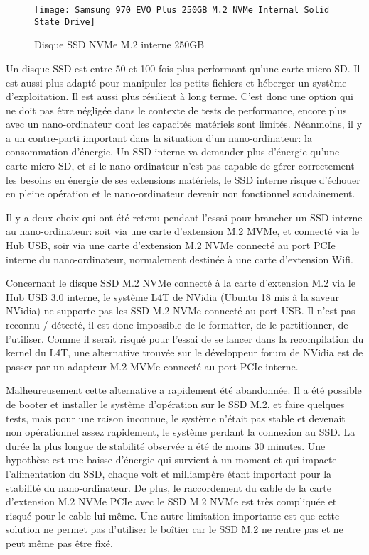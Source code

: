 \begin{figure}[H]
    \centering
    \texttt{[image: Samsung 970 EVO Plus 250GB M.2 NVMe Internal Solid State Drive]}
    \caption{Disque SSD NVMe M.2 interne 250GB}
    \label{fig:disquessd}
\end{figure}
\par Un disque SSD est entre 50 et 100 fois plus performant qu'une carte micro-SD. Il est aussi plus adapté pour manipuler les petits fichiers et héberger un système d'exploitation. Il est aussi plus résilient à long terme. C'est donc une option qui ne doit pas être négligée dans le contexte de tests de performance, encore plus avec un nano-ordinateur dont les capacités matériels sont limités. Néanmoins, il y a un contre-parti important dans la situation d'un nano-ordinateur: la consommation d'énergie. Un SSD interne va demander plus d'énergie qu'une carte micro-SD, et si le nano-ordinateur n'est pas capable de gérer correctement les besoins en énergie de ses extensions matériels, le SSD interne risque d'échouer en pleine opération et le nano-ordinateur devenir non fonctionnel soudainement.
\par Il y a deux choix qui ont été retenu pendant l'essai pour brancher un SSD interne au nano-ordinateur: soit via une carte d'extension M.2 MVMe, et connecté via le Hub USB, soir via une carte d'extension M.2 NVMe connecté au port PCIe interne du nano-ordinateur, normalement destinée à une carte d'extension Wifi.
\par Concernant le disque SSD M.2 NVMe connecté à la carte d'extension M.2 via le Hub USB 3.0 interne, le système L4T de NVidia (Ubuntu 18 mis à la saveur NVidia) ne supporte pas les SSD M.2 NVMe connecté au port USB. Il n'est pas reconnu / détecté, il est donc impossible de le formatter, de le partitionner, de l'utiliser. Comme il serait risqué pour l'essai de se lancer dans la recompilation du kernel du L4T, une alternative trouvée sur le développeur forum de NVidia est de passer par un adapteur M.2 MVMe connecté au port PCIe interne.
\par Malheureusement cette alternative a rapidement été abandonnée. Il a été possible de booter et installer le système d'opération sur le SSD M.2, et faire quelques tests, mais pour une raison inconnue, le système n'était pas stable et devenait non opérationnel assez rapidement, le système perdant la connexion au SSD. La durée la plus longue de stabilité observée a été de moins 30 minutes. Une hypothèse est une baisse d'énergie qui survient à un moment et qui impacte l'alimentation du SSD, chaque volt et milliampère étant important pour la stabilité du nano-ordinateur. De plus, le raccordement du cable de la carte d'extension M.2 NVMe PCIe avec le SSD M.2 NVMe est très compliquée et risqué pour le cable lui même. Une autre limitation importante est que cette solution ne permet pas d'utiliser le boîtier car le SSD M.2 ne rentre pas et ne peut même pas être fixé. 
